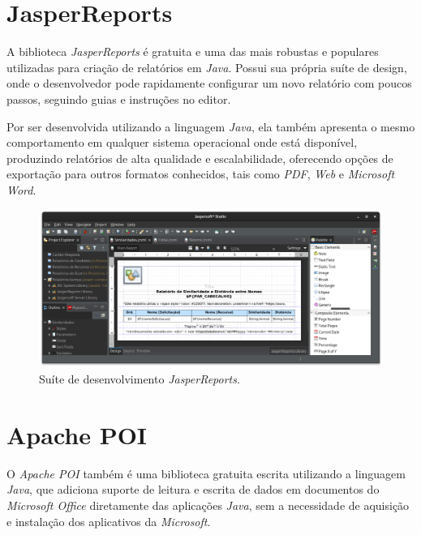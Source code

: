 \documentclass[
	12pt,			%
	openright,		%
	oneside,	
	a4paper,		%
	english,		%
	brazil			%
]{abntex2/abntex2}  %
\begin{document}
	\section{JasperReports\textregistered}
	
	A biblioteca \textit{JasperReports\textregistered} \cite{jasper} é gratuita e uma das mais robustas e populares utilizadas para criação de relatórios em \textit{Java}. Possui sua própria suíte de design, onde o desenvolvedor pode rapidamente configurar um novo relatório com poucos passos, seguindo guias e instruções no editor.
	
	Por ser desenvolvida utilizando a linguagem \textit{Java}, ela também apresenta o mesmo comportamento em qualquer sistema operacional onde está disponível, produzindo relatórios de alta qualidade e escalabilidade, oferecendo opções de exportação para outros formatos conhecidos, tais como \textit{PDF}, \textit{Web} e \textit{Microsoft Word}.
	
	\begin{figure}[H]
		\caption{\label{jasper-reports}Suíte de desenvolvimento \textit{JasperReports\textregistered}.}
		\begin{center}
			\includegraphics[scale=0.35]{img/jaspersoft}
		\end{center}
	\end{figure}

	\section{Apache POI}
	
	O \textit{Apache POI} \cite{poi} também é uma biblioteca gratuita escrita utilizando a linguagem \textit{Java}, que adiciona suporte de leitura e escrita de dados em documentos do \textit{Microsoft Office} diretamente das aplicações \textit{Java}, sem a necessidade de aquisição e instalação dos aplicativos da \textit{Microsoft}.
	
\end{document}
